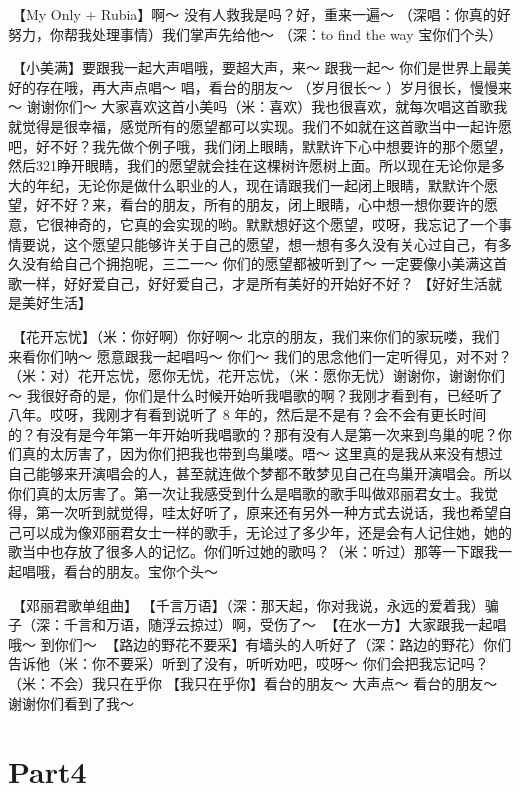 \documentclass[
]{book}
\begin{document}
🎵【My Only + Rubia】啊～ 没有人救我是吗？好，重来一遍～ （深唱：你真的好努力，你帮我处理事情）我们掌声先给他～ （深：to find the way 宝你们个头）

🎵【小美满】要跟我一起大声唱哦，要超大声，来～ 跟我一起～ 你们是世界上最美好的存在哦，再大声点唱～ 唱，看台的朋友～ （岁月很长～ ）岁月很长，慢慢来～ 谢谢你们～ 大家喜欢这首小美吗（米：喜欢）我也很喜欢，就每次唱这首歌我就觉得是很幸福，感觉所有的愿望都可以实现。我们不如就在这首歌当中一起许愿吧，好不好？我先做个例子哦，我们闭上眼睛，默默许下心中想要许的那个愿望，然后321睁开眼睛，我们的愿望就会挂在这棵树许愿树上面。所以现在无论你是多大的年纪，无论你是做什么职业的人，现在请跟我们一起闭上眼睛，默默许个愿望，好不好？来，看台的朋友，所有的朋友，闭上眼睛，心中想一想你要许的愿意，它很神奇的，它真的会实现的哟。默默想好这个愿望，哎呀，我忘记了一个事情要说，这个愿望只能够许关于自己的愿望，想一想有多久没有关心过自己，有多久没有给自己个拥抱呢，三二一～ 你们的愿望都被听到了～
一定要像小美满这首歌一样，好好爱自己，好好爱自己，才是所有美好的开始好不好？🎵【好好生活就是美好生活】

🎵【花开忘忧】（米：你好啊）你好啊～ 北京的朋友，我们来你们的家玩喽，我们来看你们呐～ 愿意跟我一起唱吗～ 你们～ 我们的思念他们一定听得见，对不对？（米：对）花开忘忧，愿你无忧，花开忘忧，（米：愿你无忧）谢谢你，谢谢你们～
我很好奇的是，你们是什么时候开始听我唱歌的啊？我刚才看到有，已经听了八年。哎呀，我刚才有看到说听了 8 年的，然后是不是有？会不会有更长时间的？有没有是今年第一年开始听我唱歌的？那有没有人是第一次来到鸟巢的呢？你们真的太厉害了，因为你们把我也带到鸟巢喽。唔～ 这里真的是我从来没有想过自己能够来开演唱会的人，甚至就连做个梦都不敢梦见自己在鸟巢开演唱会。所以你们真的太厉害了。第一次让我感受到什么是唱歌的歌手叫做邓丽君女士。我觉得，第一次听到就觉得，哇太好听了，原来还有另外一种方式去说话，我也希望自己可以成为像邓丽君女士一样的歌手，无论过了多少年，还是会有人记住她，她的歌当中也存放了很多人的记忆。你们听过她的歌吗？（米：听过）那等一下跟我一起唱哦，看台的朋友。宝你个头～

🎵【邓丽君歌单组曲】🎵【千言万语】（深：那天起，你对我说，永远的爱着我）骗子（深：千言和万语，随浮云掠过）啊，受伤了～ 🎵【在水一方】大家跟我一起唱哦～ 到你们～ 🎵【路边的野花不要采】有墙头的人听好了（深：路边的野花）你们告诉他（米：你不要采）听到了没有，听听劝吧，哎呀～ 你们会把我忘记吗？（米：不会）我只在乎你🎵【我只在乎你】看台的朋友～ 大声点～ 看台的朋友～ 谢谢你们看到了我～

\section{Part4}\label{beijing-20240921-part4}
\end{document}

